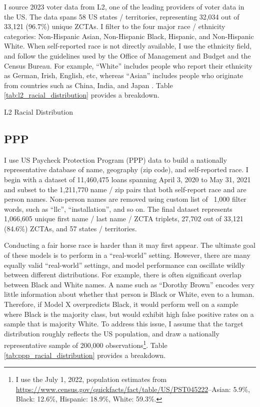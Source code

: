 \documentclass[12pt]{article}
\begin{document}
I source 2023 voter data from L2, one of the leading providers of voter data in the US. The data spans 58 US states / territories, representing 32,034 out of 33,121 (96.7\%) unique ZCTAs. I filter to the four major race / ethnicity categories: Non-Hispanic Asian, Non-Hispanic Black, Hispanic, and Non-Hispanic White. When self-reported race is not directly available, I use the ethnicity field, and follow the guidelines used by the Office of Management and Budget and the Census Bureau. For example, ``White'' includes people who report their ethnicity as German, Irish, English, etc, whereas ``Asian'' includes people who originate from countries such as China, India, and Japan \cite{racedefs}. Table \ref{tab:l2_racial_distribution} provides a breakdown.

\begin{table}[h]
    \caption{L2 Racial Distribution}
    \label{tab:l2_racial_distribution}
    \centering
    
\end{table}

\subsection{PPP}

I use US Paycheck Protection Program (PPP) data to build a nationally representative database of name, geography (zip code), and self-reported race. I begin with a dataset of 11,460,475 loans spanning April 3, 2020 to May 31, 2021 and subset to the 1,211,770 name / zip pairs that both self-report race and are person names. Non-person names are removed using custom list of ~1,000 filter words, such as ``llc'', ``installation'', and so on. The final dataset represents 1,066,605 unique first name / last name / ZCTA triplets, 27,702 out of 33,121 (84.6\%) ZCTAs, and 57 states / territories.

Conducting a fair horse race is harder than it may first appear. The ultimate goal of these models is to perform in a ``real-world'' setting. However, there are many equally valid ``real-world'' settings, and model performance can oscillate wildly between different distributions. For example, there is often significant overlap between Black and White names. A name such as ``Dorothy Brown'' encodes very little information about whether that person is Black or White, even to a human. Therefore, if Model X overpredicts Black, it would perform well on a sample where Black is the majority class, but would exhibit high false positive rates on a sample that is majority White. To address this issue, I assume that the target distribution roughly reflects the US population, and draw a nationally representative sample of 200,000 observations\footnote{I use the July 1, 2022, population estimates from \url{https://www.census.gov/quickfacts/fact/table/US/PST045222}--Asian: 5.9\%, Black: 12.6\%, Hispanic: 18.9\%, White: 59.3\%.}. Table \ref{tab:ppp_racial_distribution} provides a breakdown.
\end{document}
